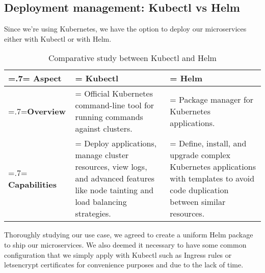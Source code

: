 \subsection{Deployment management: Kubectl vs Helm}
Since we're using Kubernetes, we have the option to deploy our microservices either with Kubectl or with Helm.
\begin{table}[H]
    \renewcommand{\arraystretch}{1.5}%
    \caption{Comparative study between Kubectl and Helm}
    \centering
    \medskip
    \begin{tabularx}{1\textwidth} {
            | >{\hsize=.7\hsize\linewidth=\hsize\centering\arraybackslash}X
            | >{\hsize=1.15\hsize\linewidth=\hsize\justifying\arraybackslash}X
            | >{\hsize=1.15\hsize\linewidth=\hsize\justifying\arraybackslash}X |}
        \hline
        \rowcolor{primary} \textbf {Aspect} & \textbf{Kubectl}                                                                                                                            & \textbf{Helm}                                                                                                                              \\
        \hline
        \textbf {Overview}                  & \noindent Official Kubernetes command-line tool for running commands against clusters.                                                      & \noindent Package manager for Kubernetes applications.                                                                                     \\
        \hline
        \textbf {Capabilities}              & \noindent Deploy applications, manage cluster resources, view logs, and advanced features like node tainting and load balancing strategies. & \noindent Define, install, and upgrade complex Kubernetes applications with templates to avoid code duplication between similar resources. \\
        \hline
    \end{tabularx}
\end{table}
Thoroughly studying our use case, we agreed to create a uniform Helm package to ship our microservices.
We also deemed it necessary to have some common configuration that we simply apply with Kubectl such as Ingress rules or letsencrypt certificates for convenience purposes and due to the lack of time.

\setcounter{secnumdepth}{0} %
